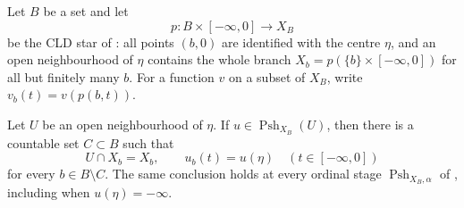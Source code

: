 
\begin{theorem}
\label{thm:p071-infinite-star-structure}
Let \(B\) be a set and let
\[
 p:B\times[-\infty,0]\longrightarrow X_B
\]
be the CLD star of \cite[\S6.7.3]{CLD25}: all points \((b,0)\)
are identified with the centre \(\eta\), and an open neighbourhood of
\(\eta\) contains the whole branch
\(X_b=p(\{b\}\times[-\infty,0])\) for all but finitely many \(b\).
For a function \(v\) on a subset of \(X_B\), write
\(v_b(t)=v(p(b,t))\).

Let \(U\) be an open neighbourhood of \(\eta\).  If
\(u\in\operatorname{Psh}_{X_B}(U)\), then there is a countable set
\(C\subset B\) such that
\begin{equation}
\label{eq:p071-countable-full-branch-constancy}
 U\cap X_b=X_b,
 \qquad
 u_b(t)=u(\eta)
 \quad(t\in[-\infty,0])
\end{equation}
for every \(b\in B\setminus C\).  The same conclusion holds at every
ordinal stage \(\operatorname{Psh}_{X_B,\alpha}\) of
\cite[Lemma~8.1.4]{CLD25}, including when \(u(\eta)=-\infty\).


\end{theorem}

